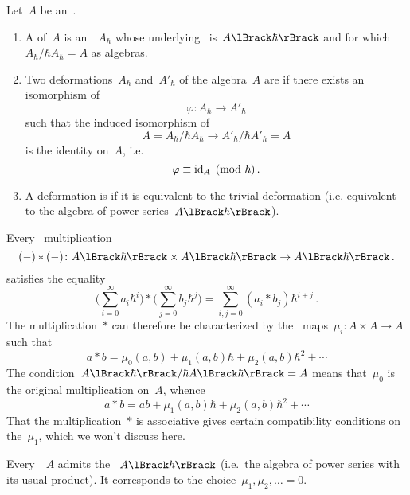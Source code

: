 \documentclass[a4paper, 11pt, oneside]{scrartcl}
\begin{document}
\begin{definition}
  \label{definition of algebra deformations}
  Let~$A$ be an~\algebra{$\kf$}.
  \begin{enumerate}
    \item
      A  of~$A$ is an~\algebra{$\kfhbar$}~$A_\hbar$ whose underlying~\module{$\kfhbar$} is~$\power{A}{\hbar}$ and for which~$A_\hbar / \hbar A_\hbar = A$ as algebras.
    \item
      Two deformations~$A_\hbar$ and~$A'_\hbar$ of the algebra~$A$ are  if there exists an isomorphism of~\algebras{$\kfhbar$}
      \[
        \varphi
        \colon
        A_\hbar
        \to
        A'_\hbar
      \]
      such that the induced isomorphism of~\algebras{$\kf$}
      \[
        A
        =
        A_\hbar / \hbar A_\hbar
        \to
        A'_\hbar / \hbar A'_\hbar
        = A
      \]
      is the identity on~$A$, i.e.
      \[
        \varphi \equiv \mathrm{id}_A
        \pmod{\hbar} \,.
      \]
    \item
      A deformation is  if it is equivalent to the trivial deformation (i.e. equivalent to the algebra of power series~$\power{A}{\hbar}$).
  \end{enumerate}
\end{definition}

\begin{remark}
  Every~\bilinear{$\kfhbar$} multiplication
  \[
    (-) * (-)
    \colon
    \power{A}{\hbar} \times \power{A}{\hbar}
    \to
    \power{A}{\hbar} \,.
  \]
  satisfies the equality
  \[
    \Biggl( \sum_{i=0}^\infty a_i \hbar^i \Biggr)
    *
    \Biggl( \sum_{j=0}^\infty b_j \hbar^j \Biggr)
    =
    \sum_{i,j = 0}^\infty (a_i * b_j) \hbar^{i+j} \,.
  \]
  The multiplication~$*$ can therefore be characterized by the~\bilinear{$\kf$} maps~$\mu_i \colon A \times A \to A$ such that
  \[
    a * b
    =
    \mu_0(a, b) + \mu_1(a, b) \hbar + \mu_2(a, b) \hbar^2 + \dotsb
  \]
  The condition~$\power{A}{\hbar} / \hbar \power{A}{\hbar} = A$ means that~$\mu_0$ is the original multiplication on~$A$, whence
  \[
    a * b
    =
    ab + \mu_1(a, b) \hbar + \mu_2(a, b) \hbar^2 + \dotsb
  \]
  That the multiplication~$*$ is associative gives certain compatibility conditions on the~$\mu_1$, which we won’t discuss here.
\end{remark}

\begin{example}
  Every~\algebra{$\kf$}~$A$ admits the ~$\power{A}{\hbar}$ (i.e.\ the algebra of power series with its usual product).
  It corresponds to the choice~$\mu_1, \mu_2, \dotsc = 0$.
\end{example}
\end{document}
